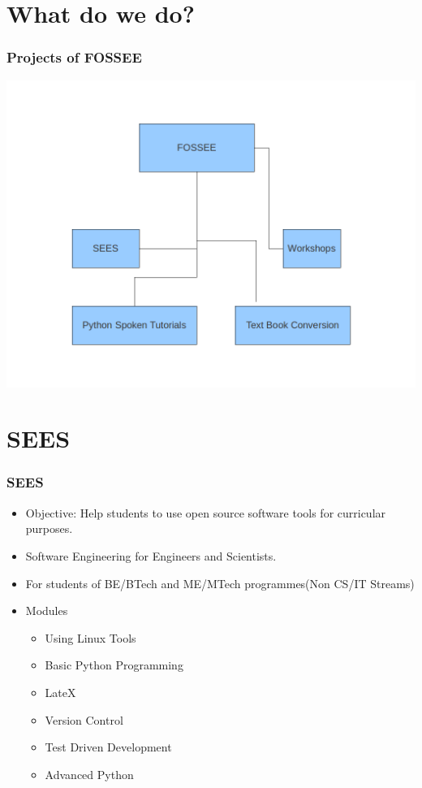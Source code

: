 \documentclass{beamer}
\begin{document}
\section{What do we do?}
\begin{frame}
  \frametitle{Projects of FOSSEE}
  \begin{center}
  	\includegraphics[scale=0.25]{st.png}
  \end{center}
\end{frame}

\section{SEES}
\begin{frame}
  \frametitle{SEES}
    \begin{itemize}
    \item Objective: Help students to use open source software tools for curricular purposes. 
    \item Software Engineering for Engineers and Scientists.
    \item For students of BE/BTech and ME/MTech programmes(Non CS/IT Streams)
    \item Modules 
    \begin{itemize}
    \item Using Linux Tools
	\item Basic Python Programming
	\item LateX
	\item Version Control
	\item Test Driven Development
	\item Advanced Python
    \end{itemize}
	\end{itemize}
\end{frame}
\end{document}
